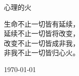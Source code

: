 \documentclass[UTF8, 12pt, a4paper]{ctexrep} %
\begin{document}
\begin{titlepage}
\centering
{}
{\sffamily\fontsize{50}{60}心理的火}\\

生命不止一切皆有延续，\\
延续不止一切皆将改变，\\
改变不止一切皆成非我，\\
非我不止一切皆归心火。\\

{\today}
\end{titlepage}







\settowidth{\versewidth}{生命不止一切皆有延续，延续不止一切皆将改变，改变不止一切皆成非我，非我不止一切皆归心火。} %

\end{document}
